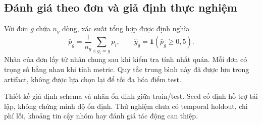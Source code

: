 \subsection{Đánh giá theo đơn và giả định thực nghiệm}
Với đơn $g$ chứa $n_g$ dòng, xác suất tổng hợp được định nghĩa
\begin{equation}
\bar p_g=\frac{1}{n_g}\sum_{i:g_i=g}p_i,\qquad
\hat y_g=\mathbf1(\bar p_g\ge0{,}5).
\end{equation}
Nhãn của đơn lấy từ nhãn chung sau khi kiểm tra tính nhất quán. Mỗi đơn
có trọng số bằng nhau khi tính metric. Quy tắc trung bình này đã được lưu
trong artifact, không được lựa chọn lại để tối đa hóa điểm test.

Thiết kế giả định schema và nhãn ổn định giữa train/test. Seed cố định
hỗ trợ tái lập, không chứng minh độ ổn định. Thử nghiệm chưa có temporal
holdout, chi phí lỗi, khoảng tin cậy nhóm hay đánh giá tác động can thiệp.
